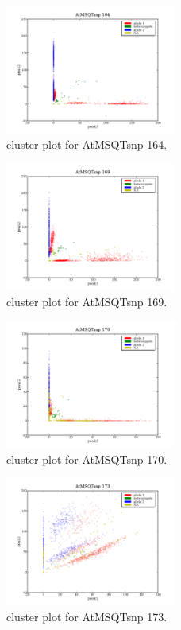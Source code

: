 \begin{figure}[H]
\includegraphics[width=0.5\textwidth]{figures/cluster_plot_AtMSQTsnp_164.png}
\caption{cluster plot for AtMSQTsnp 164.} \label{flAtMSQTsnp164}
\end{figure}

\begin{figure}[H]
\includegraphics[width=0.5\textwidth]{figures/cluster_plot_AtMSQTsnp_169.png}
\caption{cluster plot for AtMSQTsnp 169.} \label{flAtMSQTsnp169}
\end{figure}

\begin{figure}[H]
\includegraphics[width=0.5\textwidth]{figures/cluster_plot_AtMSQTsnp_170.png}
\caption{cluster plot for AtMSQTsnp 170.} \label{flAtMSQTsnp170}
\end{figure}

\begin{figure}[H]
\includegraphics[width=0.5\textwidth]{figures/cluster_plot_AtMSQTsnp_173.png}
\caption{cluster plot for AtMSQTsnp 173.} \label{flAtMSQTsnp173}
\end{figure}

